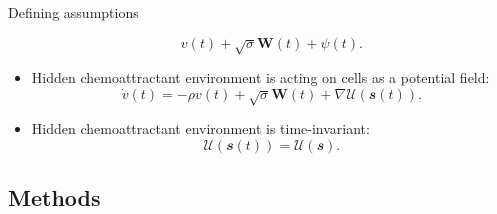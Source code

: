 \documentclass[mathserif,11pt]{beamer}
\begin{document}
\begin{frame}{Defining assumptions}
\begin{itemize}
\begin{equation*}
v(t) + \sqrt{\sigma}\mathbf{W}(t) + {\psi}(t).
	\end{equation*}
	\item<3-> Hidden chemoattractant environment is acting on cells as a potential field:
	\begin{equation*}
	\dot{v}(t) = - \rho v(t) + \sqrt{\sigma}\mathbf{W}(t) + \nabla\mathcal{U}(\mathbfit{s}(t)).
	\end{equation*}
	\item<4-> Hidden chemoattractant environment is time-invariant:
	\begin{equation*}
	\mathcal{U}(\mathbfit{s}(t)) = \mathcal{U}(\mathbfit{s}).
	\end{equation*}
\end{itemize}
\end{frame}
\subsection{Methods}
\end{document}
